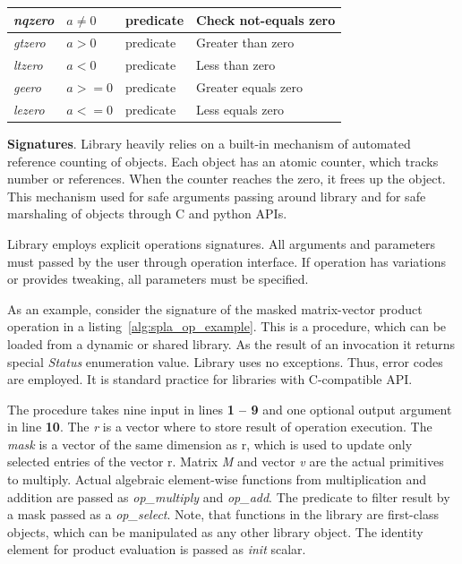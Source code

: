 \begin{table}[tbp]
\begin{center}
{\begin{tabular}{|l|l|l|l|}
    \textit{nqzero} & $a\neq 0$ & predicate & Check not-equals zero \\ \hline
    \textit{gtzero} & $a > 0$   & predicate & Greater than zero \\ \hline
    \textit{ltzero} & $a < 0$   & predicate & Less than zero \\ \hline
    \textit{geero}  & $a >= 0$  & predicate & Greater equals zero \\ \hline
    \textit{lezero} & $a <= 0$  & predicate & Less equals zero \\ \hline
    \end{tabular}
    }
    \label{tab:ewise}
\end{center}
\end{table}

\textbf{Signatures}. Library heavily relies on a built-in mechanism of automated reference counting of objects. Each object has an atomic counter, which tracks number or references. When the counter reaches the zero, it frees up the object. This mechanism used for safe arguments passing around library and for safe marshaling of objects through C and python APIs.

Library employs explicit operations signatures. All arguments and parameters must passed by the user through operation interface. If operation has variations or provides tweaking, all parameters must be specified.

As an example, consider the signature of the masked matrix-vector product operation in a listing~\ref{alg:spla_op_example}. This is a procedure, which can be loaded from a dynamic or shared library. As the result of an invocation it returns special \textit{Status} enumeration value. Library uses no exceptions. Thus, error codes are employed. It is standard practice for libraries with C-compatible API. 

The procedure takes nine input in lines \textbf{1 -- 9} and one optional output argument in line \textbf{10}. The \textit{r} is a vector where to store result of operation execution. The \textit{mask} is a vector of the same dimension as r, which is used to update only selected entries of the vector r. Matrix \textit{M} and vector \textit{v} are the actual primitives to multiply. Actual algebraic element-wise functions from multiplication and addition are passed as \textit{op\_multiply} and \textit{op\_add}. The predicate to filter result by a mask passed as a \textit{op\_select}. Note, that functions in the library are first-class objects, which can be manipulated as any other library object. The identity element for product evaluation is passed as \textit{init} scalar.

